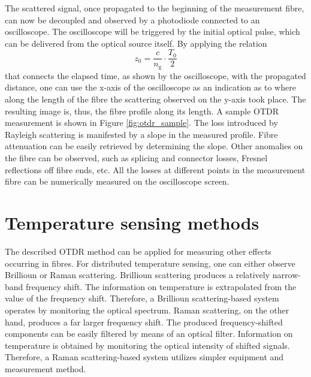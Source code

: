 \documentclass{standalone}
\begin{document}
The scattered signal, once propagated to the beginning of the measurement fibre, can now be decoupled and observed by a photodiode connected to an oscilloscope. The oscilloscope will be triggered by the initial optical pulse, which can be delivered from the optical source itself. By applying the relation 
\begin{equation} \label{eq:otdr_time_distance}
z_0 = \frac{c}{n_\textrm{g}} \cdot \frac{T_0}{2}
\end{equation}
that connects the elapsed time, as shown by the oscilloscope, with the propagated distance, one can use the x-axis of the oscilloscope as an indication as to where along the length of the fibre the scattering observed on the y-axis took place. The resulting image is, thus, the fibre profile along its length. A sample OTDR measurement is shown in Figure \ref{fig:otdr_sample}.
The loss introduced by Rayleigh scattering is manifested by a slope in the measured profile. Fibre attenuation can be easily retrieved by determining the slope. Other anomalies on the fibre can be observed, such as splicing and connector losses, Fresnel reflections off fibre ends, etc. All the losses at different points in the measurement fibre can be numerically measured on the oscilloscope screen.\\

\section{Temperature sensing methods}






The described OTDR method can be applied for measuring other effects occurring in fibres. For distributed temperature sensing, one can either observe Brillioun or Raman scattering. Brillioun scattering produces a relatively narrow-band frequency shift. The information on temperature is extrapolated from the value of the frequency shift. Therefore, a Brillioun scattering-based system operates by monitoring the optical spectrum. Raman scattering, on the other hand, produces a far larger frequency shift. The produced frequency-shifted components can be easily filtered by means of an optical filter. Information on temperature is obtained by monitoring the optical intensity of shifted signals. Therefore, a Raman scattering-based system utilizes simpler equipment and measurement method. 
\end{document}
